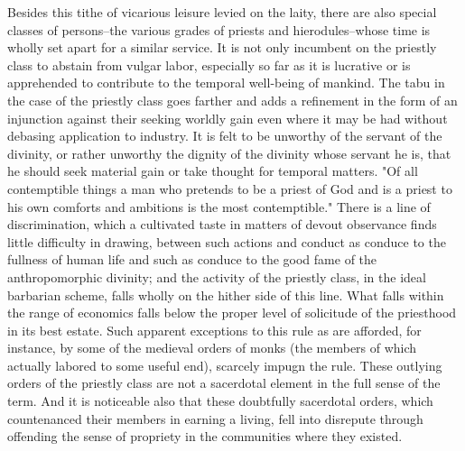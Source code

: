 \documentclass[12pt]{report}
\begin{document}
Besides this tithe of vicarious leisure levied on the laity, there
are also special classes of persons--the various grades of priests and
hierodules--whose time is wholly set apart for a similar service. It is
not only incumbent on the priestly class to abstain from vulgar labor,
especially so far as it is lucrative or is apprehended to contribute to
the temporal well-being of mankind. The tabu in the case of the priestly
class goes farther and adds a refinement in the form of an injunction
against their seeking worldly gain even where it may be had without
debasing application to industry. It is felt to be unworthy of the
servant of the divinity, or rather unworthy the dignity of the divinity
whose servant he is, that he should seek material gain or take thought
for temporal matters. "Of all contemptible things a man who pretends to
be a priest of God and is a priest to his own comforts and ambitions
is the most contemptible." There is a line of discrimination, which a
cultivated taste in matters of devout observance finds little difficulty
in drawing, between such actions and conduct as conduce to the
fullness of human life and such as conduce to the good fame of the
anthropomorphic divinity; and the activity of the priestly class, in the
ideal barbarian scheme, falls wholly on the hither side of this line.
What falls within the range of economics falls below the proper level
of solicitude of the priesthood in its best estate. Such apparent
exceptions to this rule as are afforded, for instance, by some of the
medieval orders of monks (the members of which actually labored to some
useful end), scarcely impugn the rule. These outlying orders of the
priestly class are not a sacerdotal element in the full sense of the
term. And it is noticeable also that these doubtfully sacerdotal
orders, which countenanced their members in earning a living, fell into
disrepute through offending the sense of propriety in the communities
where they existed.
\end{document}
